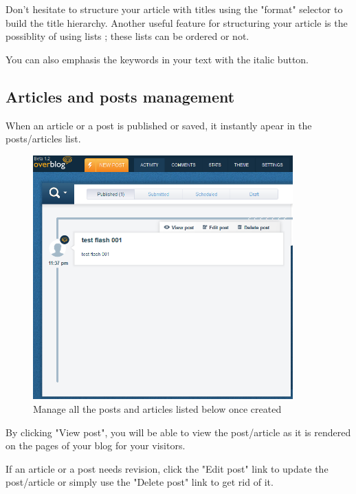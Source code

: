 \documentclass[a4paper,10pt]{article}
\begin{document}
Don't hesitate to structure your article with titles using the "format" selector to build the title hierarchy. Another useful feature for structuring your article is the possiblity of using lists ; these lists can be ordered or not. 

You can also emphasis the keywords in your text with the italic button. 

\newpage

\subsection{Articles and posts management}

When an article or a post is published or saved, it instantly apear in the posts/articles list. 

\begin{figure}[H]
    \center
	\includegraphics[width=10cm]{Images/view_edit_delete_001.png}
    \caption{Manage all the posts and articles listed below once created}
\end{figure}

By clicking "View post", you will be able to view the post/article as it is rendered on the pages of your blog for your visitors. 

If an article or a post needs revision, click the "Edit post" link to update the post/article or simply use the "Delete post" link to get rid of it. 
\end{document}
